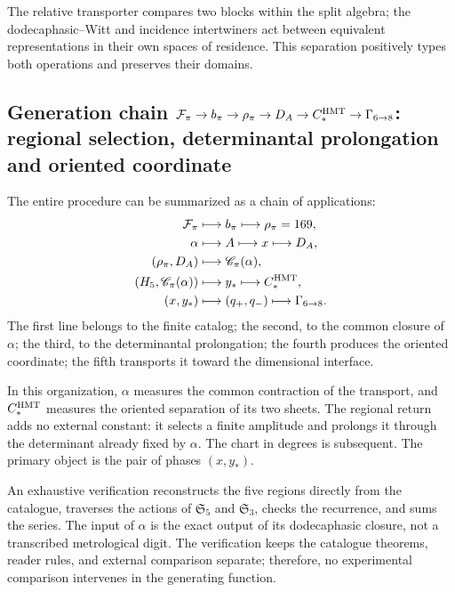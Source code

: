 The relative transporter compares two blocks within the split algebra;
the dodecaphasic--Witt and incidence intertwiners act between
equivalent representations in their own spaces of residence. This separation
positively types both operations and preserves their domains.

\subsection{Generation chain \(\mathcal F_\pi\to b_\pi\to\rho_\pi\to D_A\to C_*^{\rm HMT}\to\Gamma_{6\to8}\): regional selection, determinantal prolongation and oriented coordinate}

The entire procedure can be summarized as a chain of applications:
\[
\begin{aligned}
\mathcal F_\pi
&\longmapsto b_\pi
\longmapsto\rho_\pi=169,\\
\alpha
&\longmapsto A
\longmapsto x
\longmapsto D_A,\\
(\rho_\pi,D_A)
&\longmapsto\mathscr C_\pi(\alpha),\\
(H_5,\mathscr C_\pi(\alpha))
&\longmapsto y_*
\longmapsto C_*^{\rm HMT},\\
(x,y_*)
&\longmapsto(q_+,q_-)
\longmapsto\Gamma_{6\to8}.
\end{aligned}
\]
The first line belongs to the finite catalog; the second, to the common closure of
\(\alpha\); the third, to the determinantal prolongation; the fourth produces the
oriented coordinate; the fifth transports it toward the dimensional interface.

In this organization, \(\alpha\) measures the common contraction of the transport, and \(C_*^{\rm HMT}\) measures the oriented separation of its two sheets. The regional return adds no external constant: it selects a finite amplitude and prolongs it through the determinant already fixed by \(\alpha\). The chart in degrees is subsequent. The primary object is the pair of phases \((x,y_*)\).

An exhaustive verification reconstructs the five regions directly
from the catalogue, traverses the actions of
\(\mathfrak S_5\) and \(\mathfrak S_3\), checks the recurrence, and sums the
series. The input of \(\alpha\) is the exact output of its
dodecaphasic closure, not a transcribed metrological digit. The verification keeps
the catalogue theorems, reader rules, and external comparison
separate; therefore, no experimental comparison intervenes in the generating
function.
